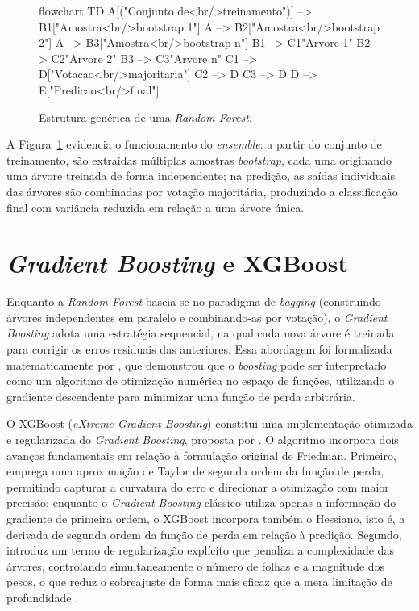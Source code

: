 \begin{figure}[htb]
\centering
\caption{Estrutura genérica de uma \textit{Random Forest}.}
\label{fig:random_forest}
\begin{mermaid}[width=0.85\textwidth,keepaspectratio]
flowchart TD
  A[("Conjunto de<br/>treinamento")] --> B1["Amostra<br/>bootstrap 1"]
  A --> B2["Amostra<br/>bootstrap 2"]
  A --> B3["Amostra<br/>bootstrap n"]
  B1 --> C1{{"Arvore 1"}}
  B2 --> C2{{"Arvore 2"}}
  B3 --> C3{{"Arvore n"}}
  C1 --> D["Votacao<br/>majoritaria"]
  C2 --> D
  C3 --> D
  D --> E["Predicao<br/>final"]
\end{mermaid}
\end{figure}

A Figura~\ref{fig:random_forest} evidencia o funcionamento do \textit{ensemble}: a partir do conjunto de treinamento, são extraídas múltiplas amostras \textit{bootstrap}, cada uma originando uma árvore treinada de forma independente; na predição, as saídas individuais das árvores são combinadas por votação majoritária, produzindo a classificação final com variância reduzida em relação a uma árvore única.

\section{\textit{Gradient Boosting} e XGBoost}

Enquanto a \textit{Random Forest} baseia-se no paradigma de \textit{bagging} (construindo árvores independentes em paralelo e combinando-as por votação), o \textit{Gradient Boosting} adota uma estratégia sequencial, na qual cada nova árvore é treinada para corrigir os erros residuais das anteriores. Essa abordagem foi formalizada matematicamente por , que demonstrou que o \textit{boosting} pode ser interpretado como um algoritmo de otimização numérica no espaço de funções, utilizando o gradiente descendente para minimizar uma função de perda arbitrária.

O XGBoost (\textit{eXtreme Gradient Boosting}) constitui uma implementação otimizada e regularizada do \textit{Gradient Boosting}, proposta por . O algoritmo incorpora dois avanços fundamentais em relação à formulação original de Friedman. Primeiro, emprega uma aproximação de Taylor de segunda ordem da função de perda, permitindo capturar a curvatura do erro e direcionar a otimização com maior precisão: enquanto o \textit{Gradient Boosting} clássico utiliza apenas a informação do gradiente de primeira ordem, o XGBoost incorpora também o Hessiano, isto é, a derivada de segunda ordem da função de perda em relação à predição. Segundo, introduz um termo de regularização explícito que penaliza a complexidade das árvores, controlando simultaneamente o número de folhas e a magnitude dos pesos, o que reduz o sobreajuste de forma mais eficaz que a mera limitação de profundidade \cite{chen2016}.

